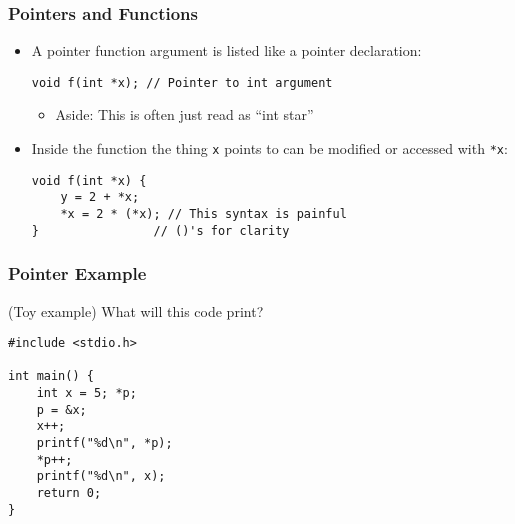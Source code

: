 \documentclass[14pt]{beamer}
\begin{document}
\begin{frame}[fragile]
\frametitle{Pointers and Functions}
\begin{itemize}
\item A pointer function argument is listed like a pointer declaration:
\begin{lstlisting}[style=CStyle]
void f(int *x); // Pointer to int argument
\end{lstlisting}
	\begin{itemize}
		\item Aside: This is often just read as ``int star''	
	\end{itemize}
\item Inside the function the thing \texttt{x} points to can be modified or accessed with \texttt{*x}:
\begin{lstlisting}[style=CStyle]
void f(int *x) {
	y =	2 + *x;
	*x = 2 * (*x); // This syntax is painful
}                // ()'s for clarity

\end{lstlisting}
\end{itemize}
\end{frame}

\begin{frame}[fragile]
\frametitle{Pointer Example}
(Toy example) What will this code print?
\begin{lstlisting}[style=CStyle]
#include <stdio.h>

int main() {
	int x = 5; *p;
	p = &x;
	x++;
	printf("%d\n", *p);
	*p++;
	printf("%d\n", x);
	return 0;
}
\end{lstlisting}
\end{frame}
\end{document}
